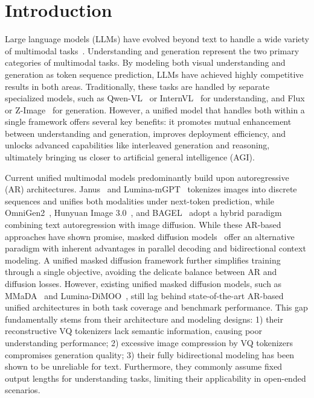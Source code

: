 \section{Introduction}
\label{sec:intro}
Large language models (LLMs) have evolved beyond text to handle a wide variety of multimodal tasks~\citep{cui2025emu3,ming_flash,wu2025qwen,gu2025ui,liu2026lumina}.
%
Understanding and generation represent the two primary categories of multimodal tasks. 
%
By modeling both visual understanding and generation as token sequence prediction, LLMs have achieved highly competitive results in both areas. 
%
Traditionally, these tasks are handled by separate specialized models, such as Qwen-VL~\citep{bai2025qwen2,team2025qwen3VL} or InternVL~\citep{Internvl,internvl2,internvl35} for understanding, and Flux~\citep{flux} or Z-Image~\citep{cai2025z} for generation. 
%
However, a unified model that handles both within a single framework offers several key benefits: it promotes mutual enhancement between understanding and generation, improves deployment efficiency, and unlocks advanced capabilities like interleaved generation and reasoning, ultimately bringing us closer to artificial general intelligence (AGI).


Current unified multimodal models predominantly build upon autoregressive (AR) architectures.
%
Janus~\citep{Janus} and Lumina-mGPT~\citep{liu2026lumina} tokenizes images into discrete sequences and unifies both modalities under next-token prediction, while OmniGen2~\citep{wu2025omnigen2}, Hunyuan Image 3.0~\citep{cao2025hunyuanimage}, and BAGEL~\citep{bagel} adopt a hybrid paradigm combining text autoregression with image diffusion.
%
While these AR-based approaches have shown promise, masked diffusion models~\citep{lou2023discrete,sahoo2024simple,xin2025resurrect} offer an alternative paradigm with inherent advantages in parallel decoding and bidirectional context modeling.
A unified masked diffusion framework further simplifies training through a single objective, avoiding the delicate balance between AR and diffusion losses.
%
However, existing unified masked diffusion models, such as MMaDA~\citep{Mmada} and Lumina-DiMOO~\citep{dimoo}, still lag behind state-of-the-art AR-based unified architectures in both task coverage and benchmark performance.
%
This gap fundamentally stems from their architecture and modeling designs: 1) their reconstructive VQ tokenizers lack semantic information, causing poor understanding performance; 2) excessive image compression by VQ tokenizers compromises generation quality; 3) their fully bidirectional modeling has been shown to be unreliable for text.
%
Furthermore, they commonly assume fixed output lengths for understanding tasks, limiting their applicability in open-ended scenarios.

